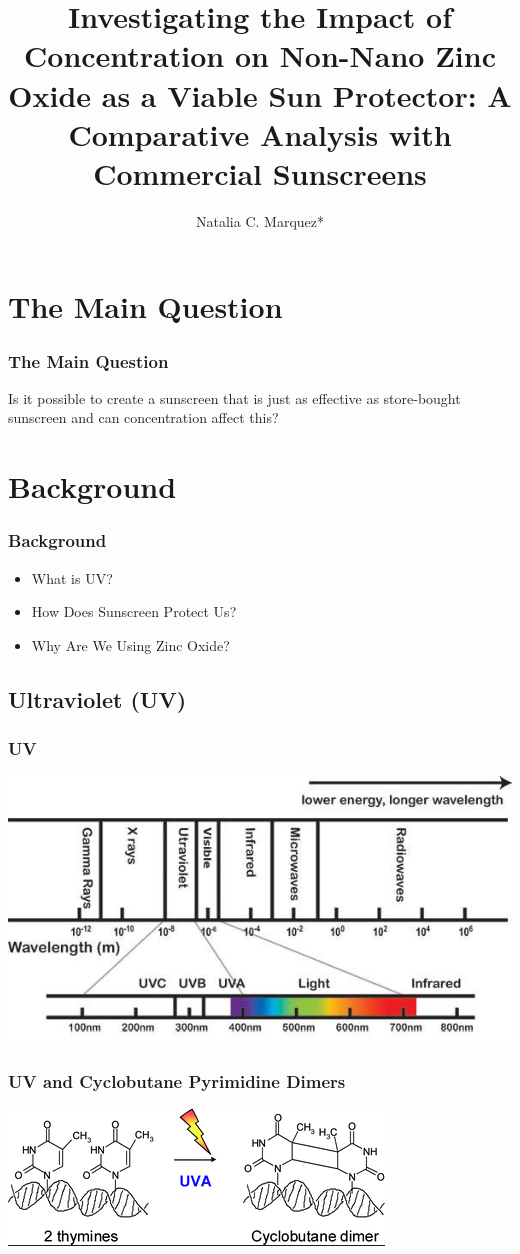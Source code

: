 \documentclass{beamer} %
\title[The Effectiveness of Sunscreen]{Investigating the Impact of Concentration on Non-Nano Zinc Oxide as a Viable Sun Protector: A Comparative Analysis with Commercial Sunscreens}
\institute[ICR]{The Institute for Computing in Research}
\author{Natalia C. Marquez*}
\begin{document}
\begin{frame}
  \titlepage
\end{frame}


\section{The Main Question}
\begin{frame}\centering
  \frametitle{The Main Question}
  Is it possible to create a sunscreen that is just as effective as store-bought sunscreen and can concentration affect this?
\end{frame}

\section{Background}
\begin{frame}
  \frametitle{Background}
  \begin{itemize}
    \item What is UV?
    \item How Does Sunscreen Protect Us?
    \item Why Are We Using Zinc Oxide?
  \end{itemize}
\end{frame}

\subsection{Ultraviolet (UV)}
\begin{frame}\centering
  \frametitle{UV}
  \includegraphics[scale = 0.7]{EMRSpectrum.jpg}
\end{frame}
\begin{frame}\centering
  \frametitle{UV and Cyclobutane Pyrimidine Dimers}
  \includegraphics{CPD.png}
\end{frame}
\end{document}
